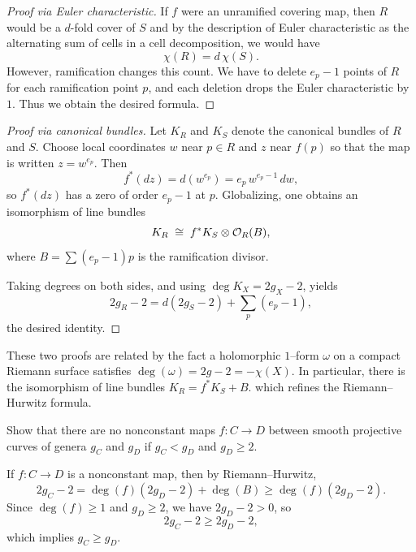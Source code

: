\documentclass[12pt]{article}
\begin{document}
\begin{proof}[Proof via Euler characteristic]
    If $f$ were an unramified covering map, then $R$ would be a $d$-fold cover of $S$ and by the description of Euler characteristic as the alternating sum of cells in a cell decomposition, we would have
    \[
        \chi(R) = d\,\chi(S).
    \]
    However, ramification changes this count. We have to delete $e_p - 1$ points of $R$ for each ramification point $p$, and each deletion drops the Euler characteristic by $1$. Thus we obtain the desired formula.
\end{proof}

\begin{proof}[Proof via canonical bundles]
    Let $K_R$ and $K_S$ denote the canonical bundles of $R$ and $S$.
    Choose local coordinates $w$ near $p\in R$ and $z$ near $f(p)$ so that
    the map is written $z = w^{e_p}$.  Then
    \[
        f^*(dz) = d(w^{e_p})
        = e_p \, w^{e_p-1}\,dw,
    \]
    so $f^*(dz)$ has a zero of order $e_p - 1$ at $p$.
    Globalizing, one obtains an isomorphism of line bundles
    \[
        K_R \;\cong\; f^*K_S \otimes {\mathcal{O}}_R(B),
    \]
    where $B = \sum (e_p-1)p$ is the ramification divisor.

    Taking degrees on both sides, and using $\deg K_X = 2g_X - 2$, yields
    \[
        2g_R - 2
        = d(2g_S - 2) + \sum_{p}(e_p - 1),
    \]
    the desired identity.
\end{proof}

\begin{remark}
    These two proofs are related by the fact a holomorphic $1$--form $\omega$ on a compact Riemann surface satisfies
    $\deg(\omega) = 2g-2 = -\chi(X)$. In particular, there is the isomorphism of line bundles
    $K_R = f^*K_S + B$.
    which refines the Riemann--Hurwitz formula.
\end{remark}

\begin{exercise}
    Show that there are no nonconstant maps $f:C\to D$ between smooth projective curves of genera $g_C$ and $g_D$ if $g_C < g_D$ and $g_D \ge 2$.
\end{exercise}

\begin{solution}
    If $f:C\to D$ is a nonconstant map, then by Riemann--Hurwitz,
    \[
        2g_C - 2 = \deg(f)(2g_D - 2) + \deg(B) \ge \deg(f)(2g_D - 2).
    \]
    Since $\deg(f)\ge 1$ and $g_D\ge 2$, we have $2g_D - 2 > 0$, so
    \[
        2g_C - 2 \ge 2g_D - 2,
    \]
    which implies $g_C \ge g_D$.
\end{solution}
\end{document}
